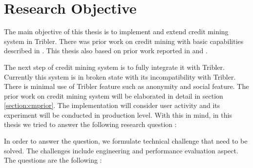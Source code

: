 \section{Research Objective}
The main objective of this thesis is to implement and extend credit mining system in Tribler. There was prior work on credit mining with basic capabilities described in \cite{2015:creditmining:capota}. This thesis also based on prior work reported in  \cite{2013:investmentcm:capota} and  \cite{2014:bwmarket:capota}. 

The next step of credit mining system is to fully integrate it with Tribler. Currently this system is in broken state with its incompatibility with Tribler. There is minimal use of Tribler feature such as anonymity and social feature. The prior work on credit mining system will be elaborated in detail in section \ref{section:cmprior}. The implementation will consider user activity and its experiment will be conducted in production level. With this in mind, in this thesis we tried to answer the following research question : 


In order to answer the question, we formulate technical challenge that need to be solved. The challenges include engineering and performance evaluation aspect. The questions are the following : 

